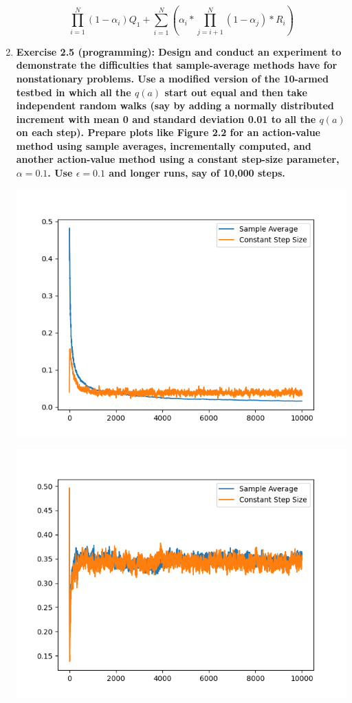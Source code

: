 \documentclass[11pt]{article}
\begin{document}
\begin{enumerate}
		$$\prod_{i=1}^N(1-\alpha_i)Q_1 + \sum_{i=1}^N(\alpha_i * \prod_{j=i+1}^N (1 - \alpha_j) * R_i)$$
		
		\item \textbf{Exercise 2.5 (programming): Design and conduct an experiment to demonstrate the difficulties that sample-average methods have for nonstationary problems. Use
		a modified version of the 10-armed testbed in which all the $q(a)$ start out equal and then take independent random walks (say by adding a normally distributed increment
		with mean 0 and standard deviation 0.01 to all the $q(a)$ on each step). Prepare plots like Figure 2.2 for an action-value method using sample averages, incrementally
		computed, and another action-value method using a constant step-size parameter, $\alpha=0.1$. Use $\epsilon=0.1$ and longer runs, say of 10,000 steps.}
		
		\includegraphics[scale=.5]{average_rewards}
		
		\includegraphics[scale=.5]{optimal_action}
		

\end{enumerate}
\end{document}

